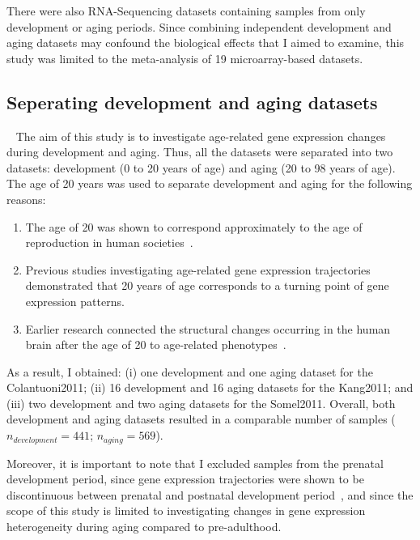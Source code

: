 There were also RNA-Sequencing datasets containing samples from only development or aging periods. 
Since combining independent development and aging datasets may confound the biological effects that I aimed to examine, 
this study was limited to the meta-analysis of 19 microarray-based datasets. 

\subsection{Seperating development and aging datasets}~\label{subsec:dset.seperation}
The aim of this study is to investigate age-related gene expression changes during development and aging. 
Thus, all the datasets were separated into two datasets: development (0 to 20 years of age) and aging (20 to 98 years of age).
The age of 20 years was used to separate development and aging for the following reasons:
\begin{enumerate}
    \item The age of 20 was shown to correspond approximately to the age of reproduction in human societies~\cite{Walker2006}.
    \item Previous studies investigating age-related gene expression trajectories demonstrated that 20 years of age corresponds to a turning point of gene expression patterns\cite{Colantuoni2011, Donertas2017, Somel2010}.
    \item Earlier research connected the structural changes occurring in the human brain after the age of 20 to age-related phenotypes~\cite{Sowell2004}.
\end{enumerate}

As a result, I obtained: 
(i) one development and one aging dataset for the Colantuoni2011; 
(ii) 16 development and 16 aging datasets for the Kang2011; and
(iii) two development and two aging datasets for the Somel2011.
Overall, both development and aging datasets resulted in a comparable number of samples ($n_{development} = 441$; $n_{aging}=569$).

Moreover, it is important to note that I excluded samples from the prenatal development period, 
since gene expression trajectories were shown to be discontinuous between prenatal and postnatal development period~\cite{Colantuoni2011, Kang2011}, 
and since the scope of this study is limited to investigating changes in gene expression heterogeneity during aging compared to pre-adulthood.

